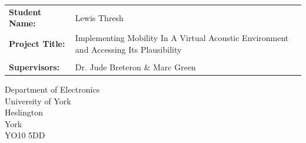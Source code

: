 \begin{titlepage}
	\vfill
	
	\Large
	\begin{tabu}{l X[l]}
		\textbf{Student Name:} & Lewis Thresh\\
		\textbf{Project Title:} & Implementing Mobility In A Virtual Acoustic Environment and Accessing Its Plausibility\\
		&\\[-8mm]
		\textbf{Supervisors:} & Dr. Jude Breteron \& Marc Green
	\end{tabu}
	
	\vfill
	
	\begin{center}
		\small
		Department of Electronics\\University of York\\Heslington\\York\\YO10 5DD
	\end{center}



	
\end{titlepage}